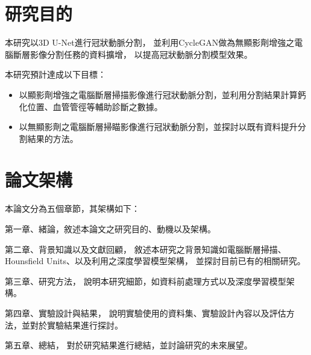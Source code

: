\documentclass[class=NCU_thesis, crop=false]{standalone}
\begin{document}
\section{研究目的}
本研究以3D U-Net進行冠狀動脈分割，
並利用CycleGAN做為無顯影劑增強之電腦斷層影像分割任務的資料擴增，
以提高冠狀動脈分割模型效果。

本研究預計達成以下目標：
\begin{itemize}
    \item 以顯影劑增強之電腦斷層掃描影像進行冠狀動脈分割，並利用分割結果計算鈣化位置、血管管徑等輔助診斷之數據。
    \item 以無顯影劑之電腦斷層掃瞄影像進行冠狀動脈分割，並探討以既有資料提升分割結果的方法。
\end{itemize}

\section{論文架構}
本論文分為五個章節，其架構如下：

第一章、緒論，敘述本論文之研究目的、動機以及架構。

第二章、背景知識以及文獻回顧，
敘述本研究之背景知識如電腦斷層掃描、Hounsfield Units、以及利用之深度學習模型架構，
並探討目前已有的相關研究。

第三章、研究方法，
說明本研究細節，如資料前處理方式以及深度學習模型架構。

第四章、實驗設計與結果，
說明實驗使用的資料集、實驗設計內容以及評估方法，並對於實驗結果進行探討。

第五章、總結，
對於研究結果進行總結，並討論研究的未來展望。
\end{document}
